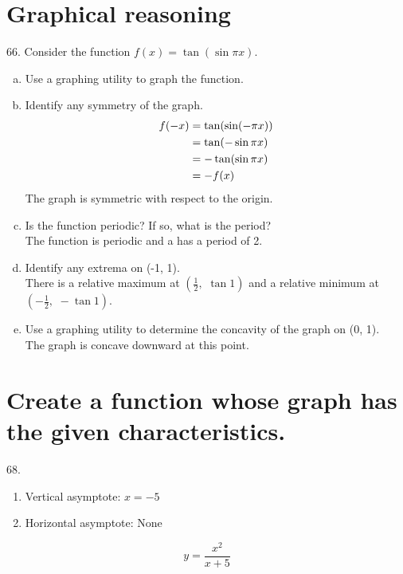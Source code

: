 \documentclass[11pt]{article}
\newcommand*{\set}{\setcounter{equation}{0}}
\begin{document}
\section{Graphical reasoning}
66. Consider the function $f(x)=\tan(\sin\pi x)$.
\begin{enumerate}[(a)]
    \item Use a graphing utility to graph the function.
    \item Identify any symmetry of the graph.
        \begin{align}
            \set
            f(-x)&=\tan(\sin(-\pi x))\\
            &=\tan(-\sin\pi x)\\
            &=-\tan(\sin\pi x)\\
            &=-f(x)
        \end{align}
        The graph is symmetric with respect to the origin.
    \item Is the function periodic? If so, what is the period?\\
        The function is periodic and a has a period of 2.
    \item Identify any extrema on (-1, 1).\\
        There is a relative maximum at $\left(\frac{1}{2},\,\,\tan 1\right)$ and a relative minimum at $(-\frac{1}{2},\,\,-\tan 1)$.
    \item Use a graphing utility to determine the concavity of the graph on (0, 1).\\
        The graph is concave downward at this point.
\end{enumerate}

\section{Create a function whose graph has the given characteristics.}
68.\begin{enumerate}
    \item Vertical asymptote: $x=-5$
    \item Horizontal asymptote: None
\end{enumerate}
\[y=\frac{x^2}{x+5}\]
\end{document}
